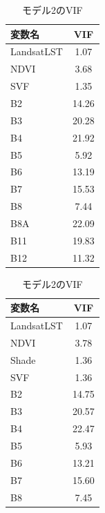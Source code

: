 \documentclass[12pt,epsf]{jreport}
\begin{document}
\begin{table}[H]
    \centering
    
    \begin{minipage}[t]{0.32\linewidth}
        \centering
        \caption{モデル1のVIF}
        \label{tab:model1vif_result}
        \begin{tabular}{lc}
            \toprule
            変数名 & VIF \\
            \midrule
            LandsatLST & 1.07 \\
            NDVI & 3.68 \\
            SVF & 1.35 \\
            B2 & 14.26 \\
            B3 & 20.28 \\
            B4 & 21.92 \\
            B5 & 5.92 \\
            B6 & 13.19 \\
            B7 & 15.53 \\
            B8 & 7.44 \\
            B8A & 22.09 \\
            B11 & 19.83 \\
            B12 & 11.32 \\
            \bottomrule
        \end{tabular}
    \end{minipage}
    \hfill
    \begin{minipage}[t]{0.32\linewidth}
        \centering
        \caption{モデル2のVIF}
        \label{tab:model2vif_result}
        \begin{tabular}{lc}
            \toprule
            変数名  & VIF \\
            \midrule
            LandsatLST & 1.07 \\
            NDVI & 3.78 \\
            Shade & 1.36 \\
            SVF & 1.36 \\
            B2 & 14.75 \\
            B3 & 20.57 \\
            B4 & 22.47 \\
            B5 & 5.93 \\
            B6 & 13.21 \\
            B7 & 15.60 \\
            B8 & 7.45 \\

\end{tabular}
\end{minipage}
\end{table}
\end{document}
